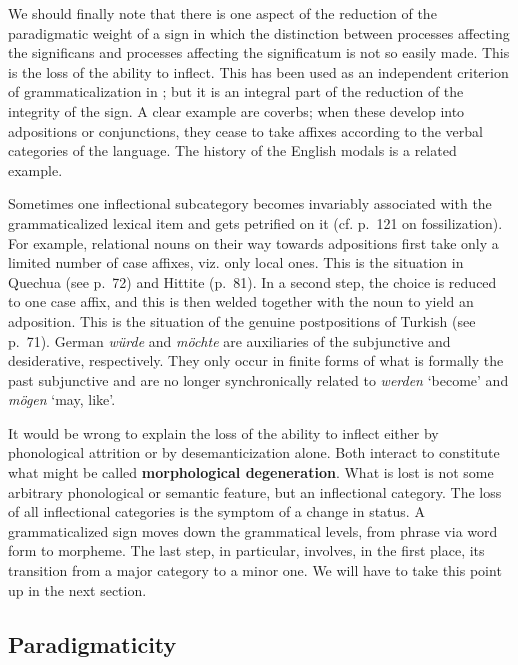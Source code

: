 We should finally note that there is one aspect of the reduction of the paradigmatic weight of a sign in which the distinction between processes affecting the significans and processes affecting the significatum is not so easily made. This is the loss of the ability to inflect. This has been used as an independent criterion of grammaticalization in \citet[84]{Givón1975}; but it is an integral part of the reduction of the integrity of the sign. A clear example are coverbs; when these develop into adpositions or conjunctions, they cease to take affixes according to the verbal categories of the language. The history of the English modals is a related example.

Sometimes one inflectional subcategory becomes invariably associated with the grammaticalized lexical item and gets petrified on it (cf. p.~121 on fossilization). For example, relational nouns on their way towards adpositions first take only a limited number of case affixes, viz. only local ones. This is the situation in Quechua (see p.~72) and Hittite (p.~81). In a second step, the choice is reduced to one case affix, and this is then welded together with the noun to yield an adposition. This is the situation of the genuine postpositions of Turkish (see p.~71). German \textit{würde} and \textit{möchte} are auxiliaries of the subjunctive and desiderative, respectively. They only occur in finite forms of what is formally the past subjunctive and are no longer synchronically related to \textit{werden} ‘become’ and \textit{mögen} ‘may, like’.

It would be wrong to explain the loss of the ability to inflect either by phonological attrition or by desemanticization alone. Both interact to constitute what might be called \textbf{morphological degeneration}. What is lost is not some arbitrary phonological or semantic feature, but an inflectional category. The loss of all inflectional categories is the symptom of a change in status. A grammaticalized sign moves down the grammatical levels, from phrase via word form to morpheme. The last step, in particular,  involves, in the first place, its transition from a major category to a minor one. We will have to take this point up in the next section.

\subsection{Paradigmaticity} \label{sec:4.2.2}


